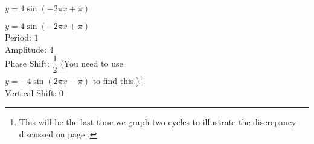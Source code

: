 {$y = 4\sin (-2\pi x + \pi)$}
{$y = 4\sin (-2\pi x + \pi)$ \\
Period: $1$\\
Amplitude: $4$\\
Phase Shift: $\dfrac{1}{2}$ (You need to use \\
$y =  -4\sin (2\pi x - \pi)$ to find this.)\footnote{This will be the last time we graph two cycles to illustrate the discrepancy discussed on page \pageref{phaseshiftissue}.}\\
Vertical Shift: $0$

\begin{center}
\end{center}
}
